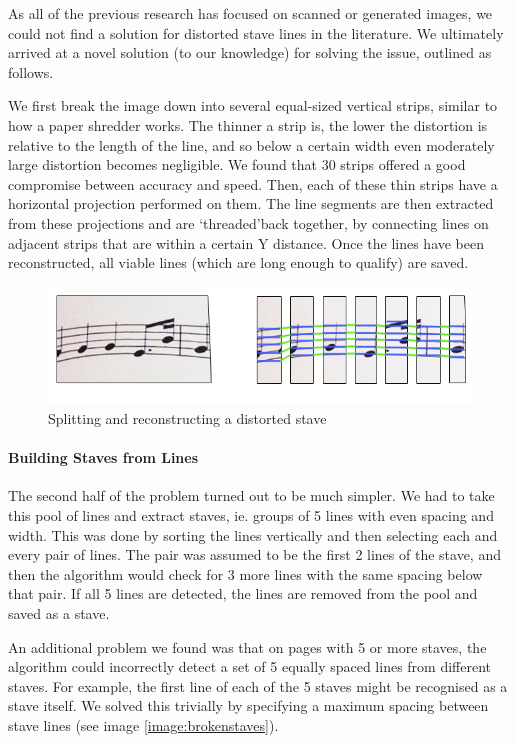 As all of the previous research has focused on scanned or generated images, we could not find a solution for distorted stave lines in the literature. We ultimately arrived at a novel solution (to our knowledge) for solving the issue, outlined as follows.

We first break the image down into several equal-sized vertical strips, similar to how a paper shredder works. The thinner a strip is, the lower the distortion is relative to the length of the line, and so below a certain width even moderately large distortion becomes negligible. We found that 30 strips offered a good compromise between accuracy and speed. Then, each of these thin strips have a horizontal projection performed on them. The line segments are
then extracted from these projections and are \lq threaded\rq  back together, by connecting lines on adjacent strips that are within a certain Y distance. Once the lines have been reconstructed, all viable lines (which are long enough to qualify) are saved.

\begin{figure}[h!]
    \centering
    \includegraphics[width=120mm]{./assets/building_lines.png}
    \caption{Splitting and reconstructing a distorted stave}
    \label{image:linesjoining}
\end{figure}

\paragraph{Building Staves from Lines}

The second half of the problem turned out to be much simpler. We had to take this pool of lines and extract staves, ie. groups of 5 lines with even spacing and width. This was done by sorting the lines vertically and then selecting each and every pair of lines. The pair was assumed to be the first 2 lines of the stave, and then the algorithm would check for 3 more lines with the same spacing below that pair. If all 5 lines are detected, the lines
are removed from the pool and saved as a stave.

An additional problem we found was that on pages with 5 or more staves, the algorithm could incorrectly detect a set of 5 equally spaced lines from different staves. For example, the first line of each of the 5 staves might be recognised as a stave itself. We solved this trivially by specifying a maximum spacing between stave lines (see image \ref{image:brokenstaves}).

